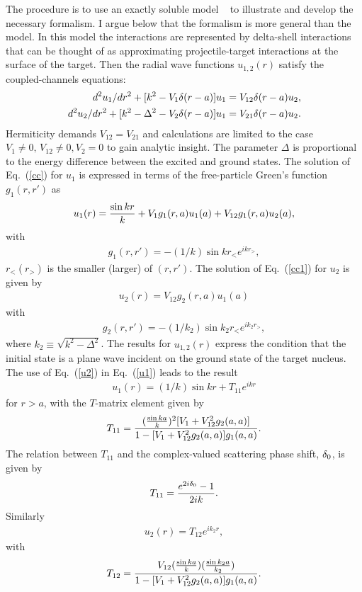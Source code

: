 \documentclass[prl,twocolumn,longbibliography,letterpaper,showpacs,groupedaddress,superscriptaddress,nofootinbib,floatfix,preprintnumbers,tightenlines]{revtex4-1}
\newcommand{\bea}{\begin{eqnarray}}
\newcommand{\eea}{\end{eqnarray}}
\newcommand{\eq}[1]{Eq.~(\ref{#1})}
\def\D{\Delta}
\begin{document}
The procedure   is to use an  exactly soluble model ~\cite{Kamal:1970xy} to illustrate and develop the necessary formalism. I argue below  that the formalism is more general than the model. In this model the interactions are represented by delta-shell interactions~\cite{Gottfried2018} that can be thought of as approximating projectile-target  interactions at the surface of the target.  Then
the radial wave functions $u_{1,2}(r)$ satisfy the coupled-channels equations:
\bea
d^2u_1/ dr^2+[k^2-V_1\d(r-a)]u_1=V_{12}\d(r-a)u_2,\label{cc}\\
d^2u_2/ dr^2+[k^2-\D^2-V_2\d(r-a)]u_1=V_{21}\d(r-a)u_2.\label{cc1}
\eea
Hermiticity demands $V_{12}=V_{21}$ and  calculations are limited to the case $V_1\ne0,\,V_{12}\ne0,V_2=0$
to gain analytic insight. The parameter $\D$ is proportional to the energy difference between the excited and ground states.
The solution of \eq{cc} for $u_1$ is expressed in terms of the free-particle Green's function $g_1(r,r') $ as
\bea 
u_1(r)={\sin{k r}\over k} +V_1g_1(r,a)u_1(a) +V_{12}g_1(r,a)u_2(a),\nonumber\\
\label{u1}\eea
with 
\bea
g_1(r,r')=-(1/k)\sin{kr_<}e^{i k r_>},
\eea
 $r_<(r_>) $ is the smaller (larger) of  $(r,r') $.
The solution of \eq{cc1} for $u_2$ is given by
\bea
u_2(r)=V_{12}g_2(r,a)u_1(a)\label{u2}\eea
with 
\bea
g_2(r,r')=-(1/k_2)\sin{k_2r_<}e^{i k_2r_>},
\eea
where $k_2\equiv \sqrt{k^2-\D^2}$.
The results for $u_{1,2}(r)$ express the condition that the initial state is a plane wave incident on the ground state of the target nucleus.
The use of \eq{u2} in \eq{u1} leads to the result
\bea
u_1(r)=(1/k)\sin{k r}+ T_{11}e^{ik r}
\eea
for $r>a$, with the $T$-matrix element given by 
\bea
T_{11}={({\sin{ka}\over k})^2[V_1+V_{12}^2g_2(a,a)]\over1-[V_1+V_{12}^2g_2(a,a)]g_1(a,a)}.
\label{T11}\eea
The relation between $T_{11}$ and the complex-valued scattering phase shift, $\delta_0$, is given by
\bea 
T_{11}={e^{2i\d_0}-1\over 2i k}.
\label{phase}\eea
Similarly
\bea u_2(r)=T_{12}e^{ik_2r},\eea
with 
\bea 
T_{12}={V_{12}({\sin{ka}\over k})({\sin{k_2a}\over k_2})\over1-[V_1+V_{12}^2g_2(a,a)]g_1(a,a)}.
\eea
\end{document}
